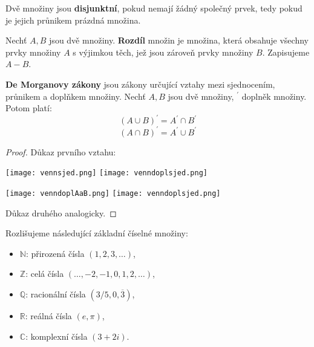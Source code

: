 \begin{definition}
  Dvě množiny jsou \textbf{disjunktní}, pokud nemají žádný společný prvek, tedy pokud je jejich průnikem prázdná množina.
\end{definition}

\begin{definition}
  Nechť $A, B$ jsou dvě množiny. \textbf{Rozdíl} množin je množina, která obsahuje všechny prvky množiny $A$ s výjimkou těch, jež jsou zároveň prvky množiny $B$. Zapisujeme $A - B$.
\end{definition}

\begin{veta}
  \textbf{De Morganovy zákony} jsou zákony určující vztahy mezi sjednocením, průnikem a doplňkem množiny. Nechť $A, B$ jsou dvě množiny, $^\prime$ doplněk množiny. Potom platí:
  $$ (A \cup B)^\prime = A^\prime \cap B^\prime$$
  $$ (A \cap B)^\prime = A^\prime \cup B^\prime$$
\end{veta}

\begin{proof}
  Důkaz prvního vztahu:

  \begin{minipage}{0.5\textwidth}
    \centering
        \texttt{[image: vennsjed.png]}
        \texttt{[image: venndoplsjed.png]}
  \end{minipage}
  \hfill
  \noindent\begin{minipage}{0.5\textwidth}
  \centering
        \texttt{[image: venndoplAaB.png]}
        \texttt{[image: venndoplsjed.png]}
  \end{minipage}

  Důkaz druhého analogicky.
\end{proof}

\begin{pozn}
  Rozlišujeme následující základní číselné množiny:
  \begin{itemize}
    \item $\mathbb{N}$: přirozená čísla $(1, 2, 3, \dots)$,
    \item $\mathbb{Z}$: celá čísla $(\dots, -2, -1, 0, 1, 2, \dots)$,
    \item $\mathbb{Q}$: racionální čísla $(3/5, 0,\overline{3})$,
    \item $\mathbb{R}$: reálná čísla $(e, \pi)$,
    \item $\mathbb{C}$: komplexní čísla $(3+2i)$.
  \end{itemize}
\end{pozn}

